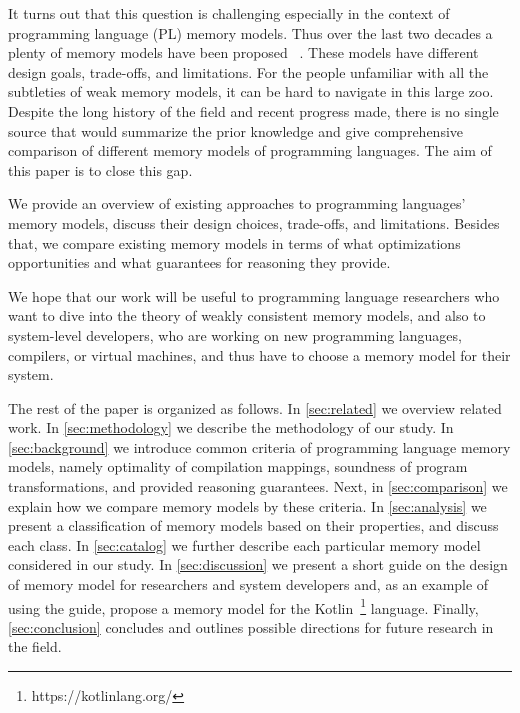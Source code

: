 It turns out that this question is challenging
especially in the context of programming language (PL) memory models.
Thus over the last two decades a plenty of memory models have been proposed~%
\cite{Manson-al:POPL05, Marino-al:PLDI10, Demange-al:POPL13, 
Batty-al:POPL11, Lahav-al:PLDI17, Dolan-al:PLDI18, Alglave-al:ASPLOS18, Watt-al:PLDI2020, 
Crary-Sullivan:POPL15, Zhang-Feng:FCS16, Jeffrey-Riely:LICS16, PichonPharabod-Sewell:POPL16, 
Kang-al:POPL17, Chakraborty-Vafeiadis:POPL19, Paviotti-al:ESOP20}. 
These models have different design goals, trade-offs, and limitations.
For the people unfamiliar with all the subtleties 
of weak memory models, it can be hard to navigate in this large zoo.
Despite the long history of the field and recent progress made, 
there is no single source that would summarize the prior knowledge
and give comprehensive comparison of different memory models
of programming languages. The aim of this paper is to close this gap.

We provide an overview of existing approaches to 
programming languages' memory models,
discuss their design choices, trade-offs, and limitations.
Besides that, we compare existing memory models 
in terms of what optimizations opportunities 
and what guarantees for reasoning they provide.

We hope that our work will be useful to programming language researchers 
who want to dive into the theory of weakly consistent memory models,
and also to system-level developers, 
who are working on new programming languages, compilers, or virtual machines, 
and thus have to choose a memory model for their system.

The rest of the paper is organized as follows.
In \cref{sec:related} we overview related work. 
In \cref{sec:methodology} we describe the methodology 
of our study. In \cref{sec:background} we 
introduce common criteria of programming language memory models,
namely optimality of compilation mappings, 
soundness of program transformations, 
and provided reasoning guarantees.
Next, in \cref{sec:comparison} we explain 
how we compare memory models by these criteria.
In \cref{sec:analysis} we present a classification
of memory models based on their properties, 
and discuss each class. 
In \cref{sec:catalog} we further describe 
each particular memory model considered in our study.
In \cref{sec:discussion} we present a short guide 
on the design of memory model for researchers and system developers
and, as an example of using the guide, propose a memory model for the Kotlin~\footnote{https://kotlinlang.org/} language.
Finally, \cref{sec:conclusion} concludes 
and outlines possible directions for future research in the field. 
